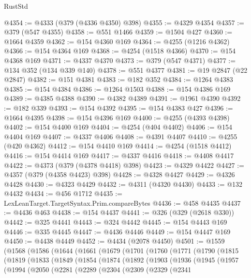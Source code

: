 \begin{lexlean}{RustStd}
\begin{coremodule}
@4354 := @4333 (@379 (@4336 @4350) @398)
@4355 := @4329 @4354
@4357 := @379 (@547 @4355)
@4358 := @551 @1466
@4359 := @1504 @427
@4360 := @1664 @4359
@4362 := @154 @4360 @169
@4364 := @4255 (@1216 @4362)
@4366 := @154 @4364 @169
@4368 := @4254 (@1518 @4366)
@4370 := @154 @4368 @169
@4371 := @4337 @4370
@4373 := @379 (@547 @4371)
@4377 := @134 @352 (@134 @339 @140)
@4378 := @551 @4377
@4381 := @19 @2847 (@22 @2847)
@4382 := @151 @4381
@4383 := @182 @352
@4384 := @1264 @4383
@4385 := @154 @4384
@4386 := @1264 @1503
@4388 := @154 @4386 @169
@4389 := @4385 @4388
@4390 := @4382 @4389
@4391 := @1961 @4390
@4392 := @182 @339
@4393 := @154 @4392
@4395 := @154 @4383 @427
@4396 := @1664 @4395
@4398 := @154 @4396 @169
@4400 := @4255 (@4393 @4398)
@4402 := @154 @4400 @169
@4404 := @4254 (@404 @4402)
@4406 := @154 @4404 @169
@4407 := @4337 @4406
@4408 := @4391 @4407
@4410 := @4255 (@420 @4362)
@4412 := @154 @4410 @169
@4414 := @4254 (@1518 @4412)
@4416 := @154 @4414 @169
@4417 := @4337 @4416
@4418 := @4408 @4417
@4422 := @4373 (@379 (@4378 @4418) @398)
@4423 := @4329 @4422
@4427 := @4357 (@379 (@4358 @4423) @398)
@4428 := @4328 @4427
@4429 := @4326 @4428
@4430 := @4323 @4429
@4432 := @4311 (@4320 @4430)
@4433 := @132 @4432
@4434 := @456 @1712
@4435 := LexLeanTarget.TargetSyntax.Prim.compareBytes
@4436 := @458 @4435
@4437 := @4436 @463
@4438 := @154 @4437
@4441 := @326 (@329 (@2618 @330))
@4442 := @325 @4441
@4443 := @324 @4442
@4445 := @154 @4443 @169
@4446 := @335 @4445
@4447 := @4436 @4446
@4449 := @154 @4447 @169
@4450 := @4438 @4449
@4452 := @4434 (@2078 @4450)
@4501 := @1559
    (@1568
      (@1586
        (@1644
          (@1661
            (@1679
              (@1701
                (@1760
                  (@1771
                    (@1790
                      (@1815
                        (@1819
                          (@1833
                            (@1849
                              (@1854
                                (@1874
                                  (@1892
                                    (@1903
                                      (@1936
                                        (@1945
                                          (@1957
                                            (@1994
                                              (@2050
                                                (@2281
                                                  (@2289
                                                    (@2304
                                                      (@2309
                                                        (@2329
                                                          (@2341

\end{coremodule}
\end{lexlean}
